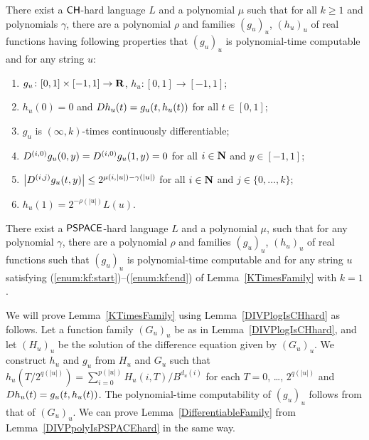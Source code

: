  \begin{lemma}
  \label{KTimesFamily}
  There exist a $\mathsf{CH}$-hard language $L$ and a polynomial $\mu$ 
  such that for all $k \ge 1$ and polynomials $\gamma$,
  there are a polynomial $\rho$ and families $(g_u)_u$, $(h_u)_u$ of real functions
  having following properties that $(g_u)_u$ is polynomial-time computable and for any string $u$:
  \begin{enumerate}
   \item \label{enum:kf:start}
	 $g_u\colon [0,1] \times [-1,1]\to \mathbf R$, $h_u\colon [0,1] \to [-1,1]$;
   \item \label{enum:equation}
	 $h_u(0) = 0$ and $D h_u(t) = g_u(t, h_u(t))$ for all $t \in [0,1]$;
   \item \label{enum:differentiability}
         $g_u$ is $(\infty, k)$-times continuously differentiable;
   \item \label{enum:boundary}
	 $
	 D^{(i, 0)} g_u(0,y) = D^{(i, 0)} g_u(1,y) = 0
         $ for all $i \in \mathbf N$ and $y \in [-1,1]$;
   \item \label{enum:smooth}
	 $
	 \left|D^{(i,j)} g_u(t,y)\right| \le 2^{\mu(i, |u|) - \gamma(|u|)}
         $ for all $i \in \mathbf N$ and $j \in \{0, \dots, k\}$;
   \item \label{enum:kf:end}
	 $h_u(1) = 2^{-\rho(|u|)} L(u)$.
  \end{enumerate}
 \end{lemma}

\begin{lemma}
 \label{DifferentiableFamily}
 There exist a $\mathsf{PSPACE}$-hard language $L$ and a polynomial $\mu$,
 such that for any polynomial $\gamma$,
 there are a polynomial $\rho$ and families $(g_u)_u$, $(h_u)_u$ of real functions
 such that $(g_u)_u$ is polynomial-time computable and for any string $u$
 satisfying (\ref{enum:kf:start})--(\ref{enum:kf:end}) of Lemma~\ref{KTimesFamily} with $k = 1$.
\end{lemma}

We will prove Lemma~\ref{KTimesFamily} using Lemma~\ref{DIVPlogIsCHhard} as follows.
Let a function family $(G_u)_u$ be as in Lemma~\ref{DIVPlogIsCHhard},
and let $(H_u)_u$ be the solution of the difference equation given by $(G_u)_u$.
We construct $h_u$ and $g_u$ from $H_u$ and $G_u$ 
such that $h_u(T/2^{q(|u|)}) = \sum^{p(|u|)}_{i = 0} H_u(i, T)/B^{d_u(i)}$ for each $T = 0$, \ldots, $2^{q(|u|)}$
and $D h_u(t) = g_u(t, h_u(t))$.
The polynomial-time computability of $(g_u)_u$ follows from that of $(G_u)_u$.
We can prove Lemma~\ref{DifferentiableFamily} from Lemma~\ref{DIVPpolyIsPSPACEhard} in the same way.

